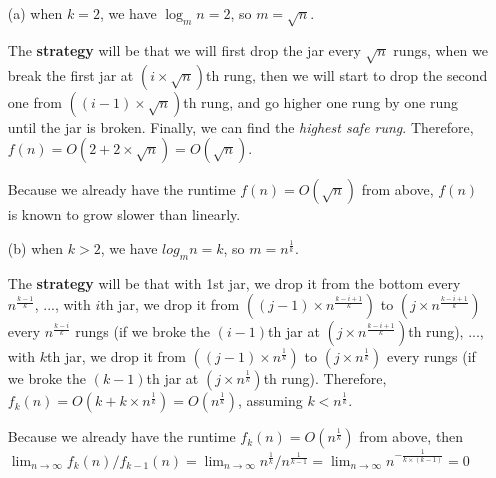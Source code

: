 \documentclass[12pt,letterpaper]{article}
\begin{document}
\begin{itemize}
    \item[(a)] when $k=2$, we have $\log_{m}n=2$, so $m=\sqrt{n}$. 
    
    The \textbf{strategy} will be that we will first drop the jar every $\sqrt{n}$ 
    rungs, when we break the first jar at $(i \times \sqrt{n})$th rung, then we 
    will start to drop the second one from $((i - 1) \times \sqrt{n})$th rung, and
    go higher one rung by one rung until the jar is broken. Finally, we can find
    the \textit{highest safe rung}. Therefore, $f(n) = O(2 + 2 \times \sqrt{n}) =
    O(\sqrt{n})$. 
    
    Because we already have the runtime $f(n) = O(\sqrt{n})$ from above, $f(n)$ 
    is known to grow slower than linearly.
    
    \item[(b)] when $k > 2$, we have $log_{m}n=k$, so $m=n^{\frac{1}{k}}$.
    
    The \textbf{strategy} will be that with 1st jar, we drop it from the bottom every 
    $n^{\frac{k-1}{k}}$, ..., with $i$th jar, we drop it from $((j - 1) \times 
    n^{\frac{k-i+1}{k}})$ to $(j \times n^{\frac{k-i+1}{k}})$ every 
    $n^{\frac{k-i}{k}}$ rungs (if we broke the $(i -1)$th jar at 
    $(j \times n^{\frac{k-i+1}{k}})$th rung), ..., with $k$th jar,
    we drop it from $((j - 1) \times n^{\frac{1}{k}})$ to 
    $(j \times n^{\frac{1}{k}})$ every rungs (if we broke the $(k -1)$th jar at 
    $(j \times n^{\frac{1}{k}})$th rung). Therefore, $f_k(n) = 
    O(k + k \times n^{\frac{1}{k}})=O(n^{\frac{1}{k}})$, assuming $k < 
    n^{\frac{1}{k}}$.
    
    Because we already have the runtime $f_k(n)=O(n^{\frac{1}{k}})$ from 
    above, then $\lim_{n \rightarrow \infty} f_k(n)/f_{k-1}(n) = 
    \lim_{n \rightarrow \infty} n^{\frac{1}{k}}/n^{\frac{1}{k-1}} = 
    \lim_{n \rightarrow \infty} n^{-\frac{1}{k\times(k-1)}} = 0$    
\end{itemize}
\end{document}
